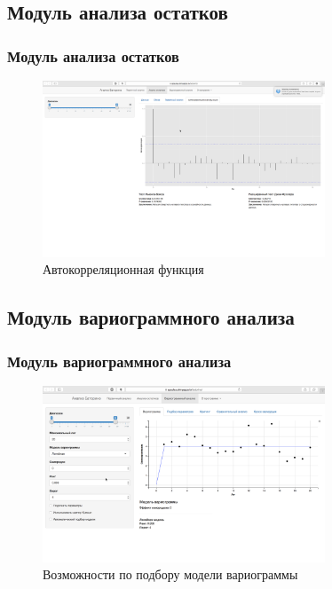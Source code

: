 \documentclass[10pt,pdf,aspectratio=169,hyperref={unicode}]{beamer}
\begin{document}
\subsection{Модуль анализа остатков}

\begin{frame}
  \frametitle{Модуль анализа остатков}
    \begin{figure}[h]
    \includegraphics[width=0.75\textwidth]{../../figures/static/3_acf.png}
    \caption{Автокорреляционная функция}
  \end{figure}
\end{frame}

\subsection{Модуль вариограммного анализа}

\begin{frame}
  \frametitle{Модуль вариограммного анализа}
    \begin{figure}[h]
    \includegraphics[width=0.75\textwidth]{../../figures/static/4_variogram.png}
    \caption{Возможности по подбору модели вариограммы}
  \end{figure}
\end{frame}
\end{document}
